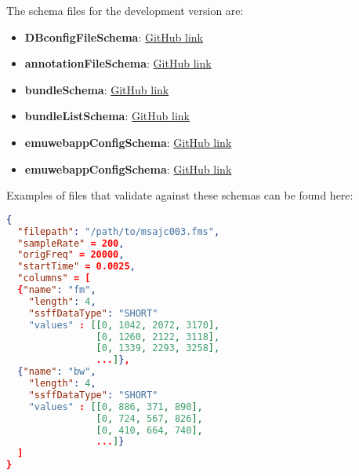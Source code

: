 \documentclass[A4,12pt, utf8]{article}
\begin{document}
The schema files for the development version are:

\begin{itemize}
  \item \textbf{DBconfigFileSchema}: \href{https://github.com/IPS-LMU/EMU-webApp/blob/master/dist/schemaFiles/DBconfigFileSchema.json}{GitHub link}
  \item \textbf{annotationFileSchema}: \href{https://github.com/IPS-LMU/EMU-webApp/blob/master/dist/schemaFiles/annotationFileSchema.json}{GitHub link}
  \item \textbf{bundleSchema}: \href{https://github.com/IPS-LMU/EMU-webApp/blob/master/dist/schemaFiles/bundleSchema.json}{GitHub link}
  \item \textbf{bundleListSchema}: \href{https://github.com/IPS-LMU/EMU-webApp/blob/master/dist/schemaFiles/bundleListSchema.json}{GitHub link}
  \item \textbf{emuwebappConfigSchema}: \href{https://github.com/IPS-LMU/EMU-webApp/blob/master/dist/schemaFiles/emuwebappConfigSchema.json}{GitHub link}
  \item \textbf{emuwebappConfigSchema}: \href{https://github.com/IPS-LMU/EMU-webApp/blob/master/dist/schemaFiles/emuwebappConfigSchema.json}{GitHub link}
\end{itemize}


Examples of files that validate against these schemas can be found here: 



\begin{lstlisting}[caption=EMU-webApp internal derived signal representation, label=idsr, language=json,firstnumber=1]
{
  "filepath": "/path/to/msajc003.fms",
  "sampleRate" = 200,
  "origFreq" = 20000,
  "startTime" = 0.0025,
  "columns" = [
  {"name": "fm",
    "length": 4,
    "ssffDataType": "SHORT"
    "values" : [[0, 1042, 2072, 3170],
                [0, 1260, 2122, 3118],
                [0, 1339, 2293, 3258],
                ...]},
  {"name": "bw",
    "length": 4,
    "ssffDataType": "SHORT"
    "values" : [[0, 886, 371, 890],
                [0, 724, 567, 826],
                [0, 410, 664, 740],
                ...]}
  ]
}
\end{lstlisting}

\clearpage
\end{document}

